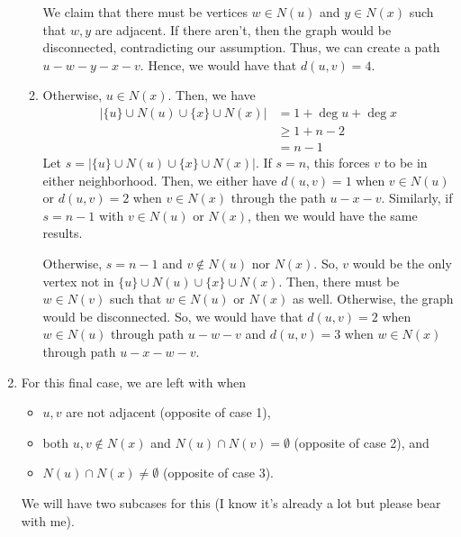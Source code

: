 \begin{solution}
\begin{enumerate}
\begin{enumerate}
          We claim that there
          must be vertices \(w \in N(u)\) and \(y \in N(x)\) such that \(w, y\) are
          adjacent. If there aren't, then the graph would
          be disconnected, contradicting our assumption. Thus, we can
          create a path \(u - w - y - x - v\). Hence, we would have that \(d(u, v) =
          4\).
        \item Otherwise, \(u \in N(x)\). Then, we have
          \[
            \begin{aligned}
              \left|\{u\} \cup N(u) \cup \{x\} \cup N(x)\right|
                &= 1 + \deg u + \deg x \\
                &\geq 1+n-2 \\
                &= n-1
            \end{aligned}
          \]
          Let \(s = \left|\{u\} \cup N(u) \cup \{x\} \cup N(x)\right|\). If \(s =
          n\), this forces \(v\) to be in either neighborhood.
          Then, we either have \(d(u, v) = 1\) when \(v \in N(u)\) or \(d(u, v)
          = 2\) when \(v \in N(x)\) through the path \(u-x-v\).
          Similarly, if \(s=n-1\) with \(v \in N(u)\) or \(N(x)\), then we would
          have the same results.

          Otherwise, \(s=n-1\) and \(v \notin N(u)\) nor \(N(x)\). So, \(v\)
          would be the only vertex not in \(\{u\} \cup N(u) \cup \{x\} \cup N(x)\).
          Then, there must be \(w \in N(v)\) such that \(w \in N(u)\) or
          \(N(x)\) as well. Otherwise, the graph would be
          disconnected. So, we would have that \(d(u, v) = 2\) when
          \(w \in N(u)\) through path \(u-w-v\) and
          \(d(u, v) = 3\) when \(w \in N(x)\) through path \(u-x-w-v\).
      \end{enumerate}

    \item For this final case, we are left with when
      \begin{itemize}
        \item \(u, v\) are not adjacent (opposite of case 1),
        \item both \(u, v \notin N(x)\) and \(N(u) \cap N(v) = \emptyset\)
          (opposite of case 2), and
        \item \(N(u) \cap N(x) \neq \emptyset\) (opposite of case 3).
      \end{itemize}
      We will have two subcases for this (I know it's already a lot but please
      bear with me).


\end{enumerate}
\end{solution}
